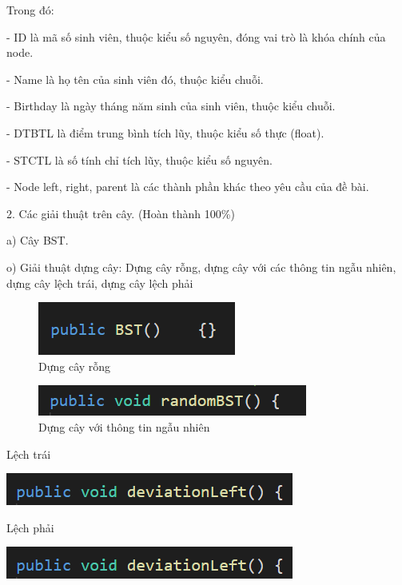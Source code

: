 \documentclass{report}
\begin{document}
Trong đó:

- ID là mã số sinh viên, thuộc kiểu số nguyên, đóng vai trò là khóa chính của node.

- Name là họ tên của sinh viên đó, thuộc kiểu chuỗi.

- Birthday là ngày tháng năm sinh của sinh viên, thuộc kiểu chuỗi.

- DTBTL là điểm trung bình tích lũy, thuộc kiểu số thực (float).

- STCTL là số tính chỉ tích lũy, thuộc kiểu số nguyên.

- Node left, right, parent là các thành phần khác theo yêu cầu của đề bài.


\newpage
\changefontsizes{14pt}
2. Các giải thuật trên cây. (Hoàn thành 100\%)

a) Cây BST.

o) Giải thuật dựng cây: Dựng cây rỗng, dựng cây với các thông tin ngẫu nhiên, dựng cây lệch trái, dựng cây lệch phải

\begin{center}
    \begin{figure}[htp]
    \begin{center}
     \includegraphics[scale=1.3]{a.png}
    \end{center}
    \caption{Dựng cây rỗng}
    \label{refhinh1}
    \end{figure}
\end{center}
 
\begin{center}
    \begin{figure}[htp]
    \begin{center}
     \includegraphics[scale=1.3]{b.png}
    \end{center}
    \caption{Dựng cây với thông tin ngẫu nhiên}
    \label{refhinh1}
    \end{figure}
\end{center}
 
Lệch trái

    \begin{center}
     \includegraphics[scale=1.2]{c}
    \end{center}
Lệch phải    
    \begin{center}
     \includegraphics[scale=1.2]{c}
    \end{center}
\end{document}
